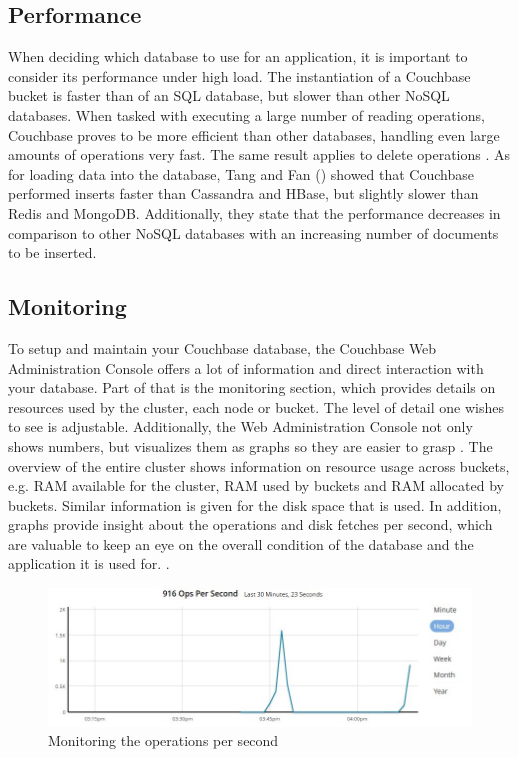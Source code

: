 \subsection{Performance}
When deciding which database to use for an application, it is important to consider its performance under high load. The instantiation of a Couchbase bucket is faster than of an SQL database, but slower than other NoSQL databases. When tasked with executing a large number of reading operations, Couchbase proves to be more efficient than other databases, handling even large amounts of operations very fast. The same result applies to delete operations \parencite{compNoSQLandSQL}.  As for loading data into the database, Tang and Fan (\parencite{insert}) showed that Couchbase performed inserts faster than Cassandra and HBase, but slightly slower than Redis and MongoDB. Additionally, they state that the performance decreases in comparison to other NoSQL databases with an increasing number of documents to be inserted.


\subsection{Monitoring}
To setup and maintain your Couchbase database, the Couchbase Web Administration Console offers a lot of information and direct interaction with your database. Part of that is the monitoring section, which provides details on resources used by the cluster, each node or bucket. The level of detail one wishes to see is adjustable. Additionally, the Web Administration Console not only shows numbers, but visualizes them as graphs so they are easier to grasp \parencite{getStarted}. The overview of the entire cluster shows information on resource usage across buckets, e.g. RAM available for the cluster, RAM used by buckets and RAM allocated by buckets. Similar information is given for the disk space that is used. In addition, graphs provide insight about the operations and disk fetches per second, which are valuable to keep an eye on the overall condition of the database and the application it is used for. \parencite{proCouchbaseServer}.

\begin{figure}
    \centering
    \includegraphics[width=\textwidth]{img/couchbaseMonitorOps.jpg}
    \caption{Monitoring the operations per second}
    \label{couchbase:figure:ops}
\end{figure}

